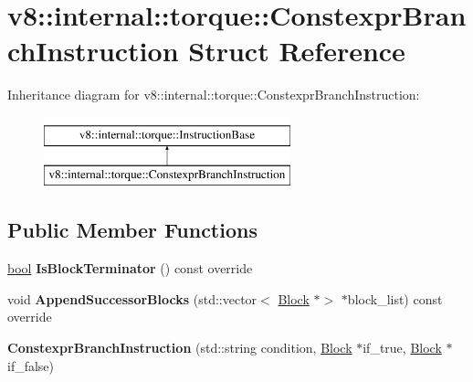 \hypertarget{structv8_1_1internal_1_1torque_1_1ConstexprBranchInstruction}{}\section{v8\+:\+:internal\+:\+:torque\+:\+:Constexpr\+Branch\+Instruction Struct Reference}
\label{structv8_1_1internal_1_1torque_1_1ConstexprBranchInstruction}
Inheritance diagram for v8\+:\+:internal\+:\+:torque\+:\+:Constexpr\+Branch\+Instruction\+:\begin{figure}[H]
\begin{center}
\leavevmode
\includegraphics[height=2.000000cm]{structv8_1_1internal_1_1torque_1_1ConstexprBranchInstruction}
\end{center}
\end{figure}
\subsection*{Public Member Functions}
\begin{DoxyCompactItemize}
\item 
\mbox{\label{structv8_1_1internal_1_1torque_1_1ConstexprBranchInstruction_a780c51c318691e88317b99b9f56ae9e9}} 
\mbox{\hyperlink{classbool}{bool}} {\bfseries Is\+Block\+Terminator} () const override
\item 
\mbox{\label{structv8_1_1internal_1_1torque_1_1ConstexprBranchInstruction_aa11751f97ad30c1c5459e194dfb06207}} 
void {\bfseries Append\+Successor\+Blocks} (std\+::vector$<$ \mbox{\hyperlink{classv8_1_1internal_1_1torque_1_1Block}{Block}} $\ast$$>$ $\ast$block\+\_\+list) const override
\item 
\mbox{\label{structv8_1_1internal_1_1torque_1_1ConstexprBranchInstruction_a7b83666f07a642172578804db49ed2e0}} 
{\bfseries Constexpr\+Branch\+Instruction} (std\+::string condition, \mbox{\hyperlink{classv8_1_1internal_1_1torque_1_1Block}{Block}} $\ast$if\+\_\+true, \mbox{\hyperlink{classv8_1_1internal_1_1torque_1_1Block}{Block}} $\ast$if\+\_\+false)
\end{DoxyCompactItemize}
